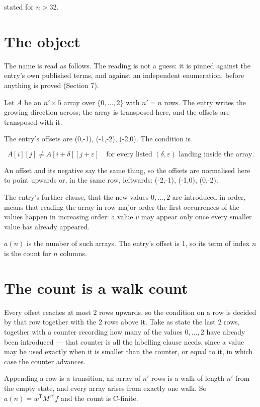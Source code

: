 \documentclass[11pt]{article}
\theoremstyle{definition}
\begin{document}
stated for $n > 32$.

\section{The object}

The name is read as follows. The reading is not a guess: it is pinned against the entry's own published terms, and against an independent enumeration, before anything is proved (Section 7).

Let $A$ be an $n' \times 5$ array over $\{0,\dots,2\}$ with $n' = n$ rows. The entry writes the growing direction across; the array is transposed here, and the offsets are transposed with it.

The entry's offsets are (0,-1), (-1,-2), (-2,0). The condition is

\[A[i][j] \ne A[i{+}\delta][j{+}\varepsilon]\quad\text{for every listed }(\delta,\varepsilon)\text{ landing inside the array.}\]

An offset and its negative say the same thing, so the offsets are normalised here to point upwards or, in the same row, leftwards: (-2,-1), (-1,0), (0,-2).

The entry's further clause, that the new values $0,\dots,2$ are introduced in order, means that reading the array in row-major order the first occurrences of the values happen in increasing order: a value $v$ may appear only once every smaller value has already appeared.

$a(n)$ is the number of such arrays. The entry's offset is 1, so its term of index $n$ is the count for $n$ columns.

\section{The count is a walk count}

Every offset reaches at most $2$ rows upwards, so the condition on a row is decided by that row together with the $2$ rows above it. Take as state the last $2$ rows, together with a counter recording how many of the values $0,\dots,2$ have already been introduced --- that counter is all the labelling clause needs, since a value may be used exactly when it is smaller than the counter, or equal to it, in which case the counter advances.

Appending a row is a transition, an array of $n'$ rows is a walk of length $n'$ from the empty state, and every array arises from exactly one walk. So $a(n) = w^{\mathsf T}M^{\,n'}f$ and the count is C-finite.
\end{document}
